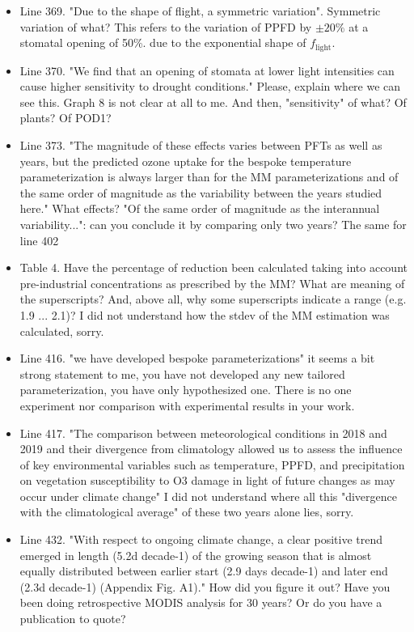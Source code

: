 \documentclass{scrartcl}
\begin{document}
\begin{itemize}
\item {\color{blue}Line 369. "Due to the shape of flight, a symmetric variation".
Symmetric variation of what?}
This refers to the variation of PPFD by $\pm 20\%$ at a stomatal opening of 50\%. due to the exponential shape of $f_\mathrm{light}$.

\item {\color{blue}Line 370. "We find that an opening of stomata at lower light intensities can cause higher sensitivity to drought conditions." Please, explain where we can see this. Graph 8 is not clear at all to me. And then, "sensitivity" of what? Of plants? Of POD1?}

\item {\color{blue}Line 373. "The magnitude of these effects varies between PFTs as well as years, but the predicted ozone uptake for the bespoke temperature parameterization is always larger than for the MM parameterizations and of the same order of magnitude as the variability between the years studied here."
What effects? "Of the same order of magnitude as the interannual variability...": can you conclude it by comparing only two years? The same for line 402}

\item {\color{blue}Table 4.  Have the percentage of reduction been calculated taking into account pre-industrial concentrations as prescribed by the MM?
What are meaning of the superscripts? And, above all, why some superscripts indicate a range (e.g. 1.9 ... 2.1)? I did not understand how the stdev of the MM estimation was calculated, sorry.}

\item {\color{blue}Line 416. "we have developed bespoke parameterizations"
it seems a bit strong statement to me, you have not developed any new tailored
parameterization, you have only hypothesized one. There is no one experiment nor
comparison with experimental results in your work.}

\item {\color{blue}Line 417. "The comparison between meteorological conditions in 2018 and 2019 and their divergence from climatology allowed us to assess the influence of key environmental variables such as temperature, PPFD, and precipitation on vegetation susceptibility to O3 damage in light of future changes as may occur under climate change" I did not understand where all this "divergence with the climatological average" of these two years alone lies, sorry.}

\item {\color{blue}Line 432. "With respect to ongoing climate change, a clear positive trend emerged in length (5.2d decade-1) of the growing season that is almost equally distributed between earlier start (2.9 days decade-1) and later end (2.3d decade-1) (Appendix Fig. A1)." How did you figure it out? Have you been doing retrospective MODIS analysis for 30 years? Or do you have a publication to quote?}


\end{itemize}
\end{document}
